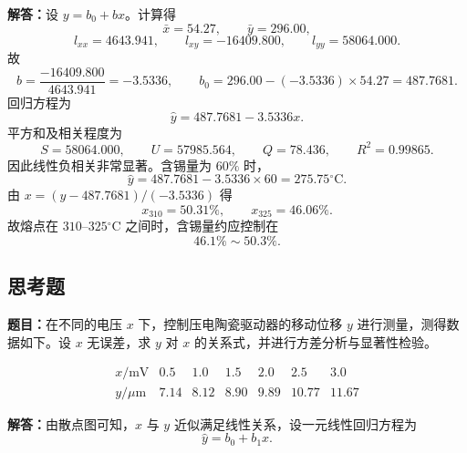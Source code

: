 \documentclass[UTF8,zihao=-4]{ctexart}
\newcommand{\problem}[1]{\subsection*{#1}}
\newcommand{\timu}{\noindent\textbf{题目：}}
\newcommand{\jieda}{\noindent\textbf{解答：}}
\begin{document}
{\jieda 设 $y=b_0+bx$。计算得
\begin{equation*}
    \bar x=54.27,
    \qquad
    \bar y=296.00,
\end{equation*}
\begin{equation*}
    l_{xx}=4643.941,
    \qquad
    l_{xy}=-16409.800,
    \qquad
    l_{yy}=58064.000.
\end{equation*}
故
\begin{equation*}
    b=\frac{-16409.800}{4643.941}=-3.5336,
    \qquad
    b_0=296.00-(-3.5336)\times54.27=487.7681.
\end{equation*}
回归方程为
\begin{equation*}
    \hat y=487.7681-3.5336x.
\end{equation*}
平方和及相关程度为
\begin{equation*}
    S=58064.000,
    \qquad
    U=57985.564,
    \qquad
    Q=78.436,
    \qquad
    R^2=0.99865.
\end{equation*}
因此线性负相关非常显著。含锡量为 $60\%$ 时，
\begin{equation*}
    \hat y=487.7681-3.5336\times60=275.75{}^\circ\mathrm{C}.
\end{equation*}
由 $x=(y-487.7681)/(-3.5336)$ 得
\begin{equation*}
    x_{310}=50.31\%,
    \qquad
    x_{325}=46.06\%.
\end{equation*}
故熔点在 $310$--$325{}^\circ\mathrm{C}$ 之间时，含锡量约应控制在
\begin{equation*}
    46.1\%\sim50.3\%.
\end{equation*}

\newpage

\problem{思考题}

\timu 在不同的电压 $x$ 下，控制压电陶瓷驱动器的移动位移 $y$ 进行测量，测得数据如下。设 $x$ 无误差，求 $y$ 对 $x$ 的关系式，并进行方差分析与显著性检验。

\begin{equation*}
\begin{array}{c|cccccc}
x/\mathrm{mV} & 0.5 & 1.0 & 1.5 & 2.0 & 2.5 & 3.0 \\
y/\mu\mathrm{m} & 7.14 & 8.12 & 8.90 & 9.89 & 10.77 & 11.67
\end{array}
\end{equation*}

\jieda 由散点图可知，$x$ 与 $y$ 近似满足线性关系，设一元线性回归方程为
\begin{equation*}
    \hat{y}=b_0+b_1x .
\end{equation*}

}
\end{document}
